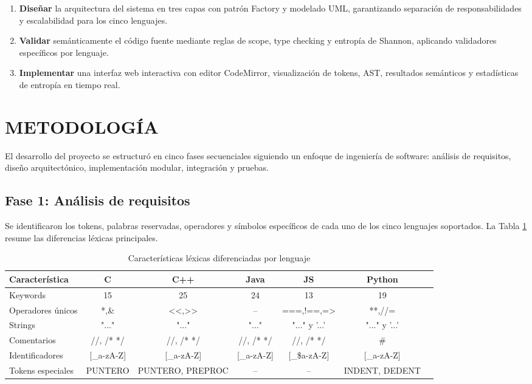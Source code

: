 \documentclass[12pt,a4paper]{article}
\begin{document}
\begin{enumerate}[label=\textbf{O\arabic*:}]
    \item \textbf{Diseñar} la arquitectura del sistema en tres capas con patrón Factory y modelado UML, garantizando separación de responsabilidades y escalabilidad para los cinco lenguajes.
    \item \textbf{Validar} semánticamente el código fuente mediante reglas de scope, type checking y entropía de Shannon, aplicando validadores específicos por lenguaje.
    \item \textbf{Implementar} una interfaz web interactiva con editor CodeMirror, visualización de tokens, AST, resultados semánticos y estadísticas de entropía en tiempo real.
\end{enumerate}

\section{METODOLOGÍA}

El desarrollo del proyecto se estructuró en cinco fases secuenciales siguiendo un enfoque de ingeniería de software: análisis de requisitos, diseño arquitectónico, implementación modular, integración y pruebas.

\subsection{Fase 1: Análisis de requisitos}

Se identificaron los tokens, palabras reservadas, operadores y símbolos específicos de cada uno de los cinco lenguajes soportados. La Tabla \ref{tab:lenguajes} resume las diferencias léxicas principales.

\begin{table}[H]
\centering
\small
\caption{Características léxicas diferenciadas por lenguaje}
\label{tab:lenguajes}
\begin{tabular}{@{}p{2.8cm}cccccc@{}}
\toprule
\textbf{Característica} & \textbf{C} & \textbf{C++} & \textbf{Java} & \textbf{JS} & \textbf{Python} \\
\midrule
Keywords & 15 & 25 & 24 & 13 & 19 \\
\addlinespace
Operadores únicos & *,\& & <<,>> & -- & ===,!==,=> & **,//= \\
\addlinespace
Strings & "..." & "..." & "..." & "..." y '...' & "..." y '...' \\
\addlinespace
Comentarios & //, /* */ & //, /* */ & //, /* */ & //, /* */ & \# \\
\addlinespace
Identificadores & [\_a-zA-Z] & [\_a-zA-Z] & [\_a-zA-Z] & [\_\$a-zA-Z] & [\_a-zA-Z] \\
\addlinespace
Tokens especiales & PUNTERO & PUNTERO, PREPROC & -- & -- & INDENT, DEDENT \\
\bottomrule
\end{tabular}
\end{table}
\end{document}
